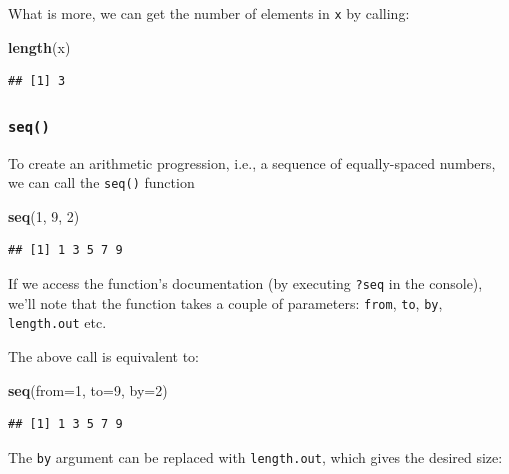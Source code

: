 \documentclass[10pt,b5paper,krantz1]{krantz}
\newenvironment{Shaded}{\begin{snugshade}}{\end{snugshade}}
\newcommand{\DataTypeTok}[1]{\textcolor[rgb]{0.27,0.27,0.27}{#1}}
\newcommand{\DecValTok}[1]{\textcolor[rgb]{0.06,0.06,0.06}{#1}}
\newcommand{\KeywordTok}[1]{\textcolor[rgb]{0.27,0.27,0.27}{\textbf{#1}}}
\newcommand{\NormalTok}[1]{#1}
\begin{document}
What is more, we can get the number of elements in \texttt{x} by calling:

\begin{Shaded}
\begin{Highlighting}[]
\KeywordTok{length}\NormalTok{(x)}
\end{Highlighting}
\end{Shaded}

\begin{verbatim}
## [1] 3
\end{verbatim}

\hypertarget{seq}{%
\subsubsection{\texorpdfstring{\texttt{seq()}}{seq()}}\label{seq}}

To create an arithmetic progression,
i.e., a sequence of equally-spaced numbers,
we can call the \texttt{seq()} function

\begin{Shaded}
\begin{Highlighting}[]
\KeywordTok{seq}\NormalTok{(}\DecValTok{1}\NormalTok{, }\DecValTok{9}\NormalTok{, }\DecValTok{2}\NormalTok{)}
\end{Highlighting}
\end{Shaded}

\begin{verbatim}
## [1] 1 3 5 7 9
\end{verbatim}

If we access the function's documentation (by executing \texttt{?seq} in the console),
we'll note that the function takes a couple of parameters:
\texttt{from}, \texttt{to}, \texttt{by}, \texttt{length.out} etc.

The above call is equivalent to:

\begin{Shaded}
\begin{Highlighting}[]
\KeywordTok{seq}\NormalTok{(}\DataTypeTok{from=}\DecValTok{1}\NormalTok{, }\DataTypeTok{to=}\DecValTok{9}\NormalTok{, }\DataTypeTok{by=}\DecValTok{2}\NormalTok{)}
\end{Highlighting}
\end{Shaded}

\begin{verbatim}
## [1] 1 3 5 7 9
\end{verbatim}

The \texttt{by} argument can be replaced with \texttt{length.out}, which gives the desired
size:
\end{document}
